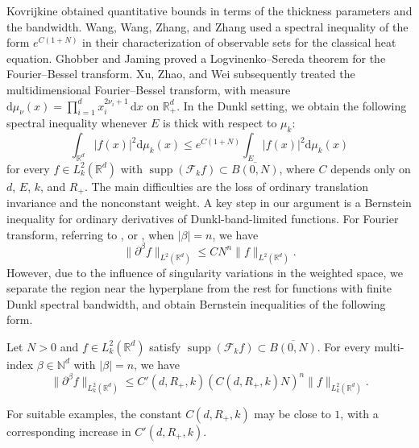 \documentclass[12pt]{article}
\DeclareMathOperator{\supp}{supp}
\begin{document}
Kovrijkine \cite{OK} obtained quantitative bounds in terms of the thickness parameters and the bandwidth. Wang, Wang, Zhang, and Zhang \cite{GWW} used a spectral inequality of the form $e^{C(1+N)}$ in their characterization of observable sets for the classical heat equation. Ghobber and Jaming \cite{SGP} proved a Logvinenko--Sereda theorem for the Fourier--Bessel transform. Xu, Zhao, and Wei \cite{HX} subsequently treated the multidimensional Fourier--Bessel transform, with measure $\mathrm{d}\mu_\nu(x)=\prod_{i=1}^d x_i^{2\nu_i+1}\,\mathrm{d}x$ on $\mathbb{R}_+^d$. %
In the Dunkl setting, we obtain the following spectral inequality whenever $E$ is thick with respect to $\mu_k$:
\begin{equation}
\int_{\mathbb{R}^{d}} |f(x)|^{2}\mathrm{d}\mu_k(x)
\leq e^{C(1+N)} \int_{E} |f(x)|^{2}\mathrm{d}\mu_k(x)
\end{equation}
for every $f\in L_k^2(\mathbb{R}^d)$ with $\supp(\mathcal{F}_k f)\subset\overline{B(0,N)}$,
where $C$ depends only on $d$, $E$, $k$, and $R_+$.
The main difficulties are the loss of ordinary translation invariance and the nonconstant weight. A key step in our argument is a Bernstein inequality for ordinary derivatives of Dunkl-band-limited functions. For Fourier transform, referring to \cite{SNB},\cite{REA} or \cite{GEB}, when \(|\beta|=n\), we have 
\[
\|\partial^\beta f\|_{L^2(\mathbb{R}^d)}\leq C N^n\|f\|_{L^2(\mathbb{R}^d)}.
\]
However, due to the influence of singularity variations in the weighted space, we separate the region near the hyperplane from the rest for functions with finite Dunkl spectral bandwidth, and obtain Bernstein inequalities of the following form.

\begin{theorem}\label{TBNST}
Let $N>0$ and $f\in L_k^2(\mathbb{R}^d)$ satisfy $\supp(\mathcal{F}_k f)\subset\overline{B(0,N)}$. For every multi-index $\beta\in\mathbb{N}^d$ with $|\beta|=n$, we have
\begin{equation}
\|\partial^\beta f\|_{L_k^2(\mathbb{R}^d)}\leq C'(d,R_+,k)(C(d,R_+,k)N)^n\|f\|_{L_k^2(\mathbb{R}^d)}.
\end{equation}
\end{theorem}
 
For suitable examples, the constant $C(d,R_+,k)$ may be close to $1$, with a corresponding increase in $C'(d,R_+,k)$.
\end{document}

